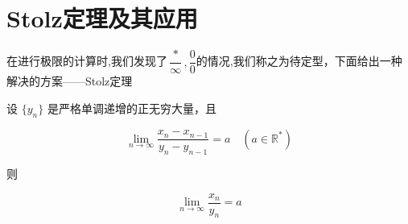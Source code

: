 \section{Stolz定理及其应用}
在进行极限的计算时,我们发现了$\dfrac{*}{\infty},\dfrac{0}{0}$的情况,我们称之为待定型，下面给出一种解决的方案——Stolz定理
\begin{theorem}
	设 $\{y_n\}$ 是严格单调递增的正无穷大量，且
	
	$$ \lim_{n \to \infty} \dfrac{x_n - x_{n-1}}{y_n - y_{n-1}} = a \quad (a \in \mathbb{R}^* ) $$
	
	则
	
	$$ \lim_{n \to \infty} \frac{x_n}{y_n} = a $$
	
\end{theorem}
